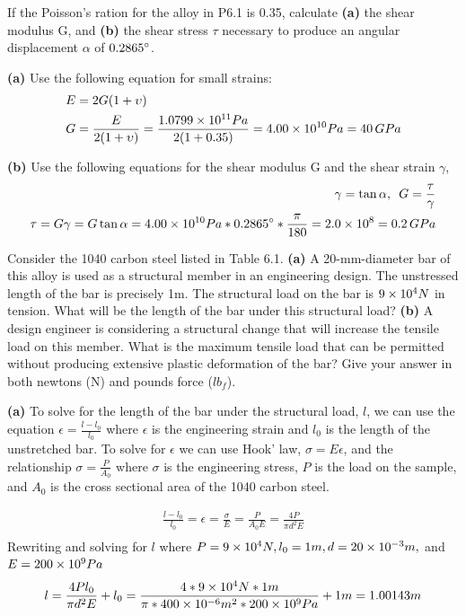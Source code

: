 \documentclass[12pt]{article}
\newenvironment{problem}[2][Problem]{\begin{trivlist}
\item[\hskip \labelsep {\bfseries #1}\hskip \labelsep {\bfseries #2.}]}{\end{trivlist}}
\begin{document}
\begin{problem}{6.2}
If the Poisson's ration for the alloy in P6.1 is 0.35, calculate \textbf{(a)} the shear modulus G, and \textbf{(b)} the shear stress $\tau$ necessary to produce an angular displacement $\alpha$ of $ 0.2865\degree$.
\end{problem}

\textbf{(a)} Use the following equation for small strains:
\begin{align*}
E & = 2G(1 + \upsilon)\\
G & = \frac{E}{2(1 + \upsilon)} = \frac{1.0799 \times 10^{11} Pa}{2(1 + 0.35)} = 4.00 \times 10^{10} Pa = 40 \, GPa
\end{align*}

\textbf{(b)} Use the following equations for the shear modulus G and the shear strain $\gamma$,
\begin{align*}
\gamma = \tan{\alpha} ,\,\,\, G = \frac{\tau}{\gamma} \\
\tau = G\gamma = G\tan{\alpha} = 4.00 \times 10^{10} Pa * 0.2865\degree * \frac{\pi}{180} = 2.0 \times 10^{8} = 0.2 \, GPa
\end{align*}

\begin{problem}{6.4}
Consider the 1040 carbon steel listed in Table 6.1. \textbf{(a)} A 20-mm-diameter bar of this alloy is used as a structural member in an engineering design. The unstressed length of the bar is precisely 1m. The structural load on the bar is $9 \times 10^{4} N$ in tension. What will be the length of the bar under this structural load? \textbf{(b)} A design engineer is considering a structural change that will increase the tensile load on this member. What is the maximum tensile load that can be permitted without producing extensive plastic deformation of the bar? Give your answer in both newtons (N) and pounds force ($lb_f$).
\end{problem}

\textbf{(a)} To solve for the length of the bar under the structural load, $l$, we can use the equation $\epsilon = \frac{l-l_0}{l_0}$ where $\epsilon$ is the engineering strain and $l_0$ is the length of the unstretched bar. To solve for $\epsilon$ we can use Hook' law, $\sigma = E\epsilon$, and the relationship $\sigma = \frac{P}{A_0}$ where $\sigma$ is the engineering stress, $P$ is the load on the sample, and $A_0$ is the cross sectional area of the 1040 carbon steel.

\begin{align*}
\frac{l-l_0}{l_0} = \epsilon = \frac{\sigma}{E} = \frac{P}{A_0 E} = \frac{4P}{\pi d^2 E} \\
\end{align*}
Rewriting and solving for $l$ where $P = 9 \times 10^{4} N, l_0 = 1m, d = 20 \times 10^{-3}m,$ and $E = 200 \times 10^{9} Pa$
\begin{align*}
l = \frac{4 P l_0}{\pi d^2 E} + l_0 = \frac{4*9 \times 10^{4} N*1m}{\pi * 400 \times 10^{-6}m^2 * 200 \times 10^{9} Pa} + 1m = 1.00143 m 
\end{align*}
\end{document}
